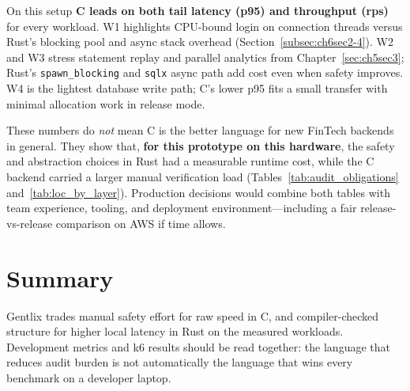 \par On this setup \textbf{C leads on both tail latency (p95) and throughput (rps)} for 
every workload. W1 highlights CPU-bound login on connection threads versus Rust's blocking 
pool and async stack overhead (Section~\ref{subsec:ch6sec2-4}). W2 and W3 stress 
statement replay and parallel analytics from Chapter~\ref{sec:ch5sec3}; Rust's 
\texttt{spawn\_blocking} and \texttt{sqlx} async path add cost even when safety improves. 
W4 is the lightest database write path; C's lower p95 fits a small transfer with minimal 
allocation work in release mode.

\par These numbers do \emph{not} mean C is the better language for new FinTech backends in 
general. They show that, \textbf{for this prototype on this hardware}, the safety and 
abstraction choices in Rust had a measurable runtime cost, while the C backend carried 
a larger manual verification load (Tables~\ref{tab:audit_obligations} 
and~\ref{tab:loc_by_layer}). Production decisions would combine both tables with team 
experience, tooling, and deployment environment---including a fair release-vs-release 
comparison on AWS if time allows.

\section*{Summary}

\par Gentlix trades manual safety effort for raw speed in C, and compiler-checked structure 
for higher local latency in Rust on the measured workloads. Development metrics and k6 
results should be read together: the language that reduces audit burden is not automatically 
the language that wins every benchmark on a developer laptop.
